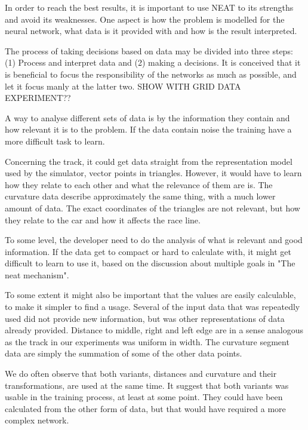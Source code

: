 In order to reach the best results, it is important to use NEAT to its strengths and avoid its weaknesses. One aspect is how the problem is modelled for the neural network, what data is it provided with and how is the result interpreted.

The process of taking decisions based on data may be divided into three steps: (1) Process and interpret data and (2) making a decisions. It is conceived that it is beneficial to focus the responsibility of the networks as much as possible, and let it focus manly at the latter two. SHOW WITH GRID DATA EXPERIMENT??

A way to analyse different sets of data is by the information they contain and how relevant it is to the problem. If the data contain noise the training have a more difficult task to learn.

Concerning the track, it could get data straight from the representation model used by the simulator, vector points in triangles. However, it would have to learn how they relate to each other and what the relevance of them are is. The curvature data describe approximately the same thing, with a much lower amount of data. The exact coordinates of the triangles are not relevant, but how they relate to the car and how it affects the race line. 

To some level, the developer need to do the analysis of what is relevant and good information. If the data get to compact or hard to calculate with, it might get difficult to learn to use it, based on the discussion about multiple goals in "The neat mechanism".

To some extent it might also be important that the values are easily calculable, to make it simpler to find a usage. Several of the input data that was repeatedly used did not provide new information, but was other representations of data already provided. Distance to middle, right and left edge are in a sense analogous as the track in our experiments was uniform in width. The curvature segment data are simply the summation of some of the other data points.

We do often observe that both variants, distances and curvature and their transformations, are used at the same time. It suggest that both variants was usable in the training process, at least at some point. They could have been calculated from the other form of data, but that would have required a more complex network.




